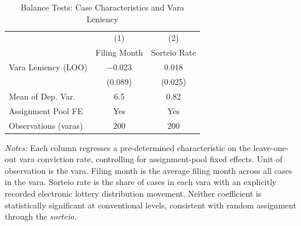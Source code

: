 \begin{table}[htbp]
\centering
\caption{Balance Tests: Case Characteristics and Vara Leniency}
\label{tab:balance}
\begin{tabular}{lcc}
\toprule
& (1) & (2) \\
& Filing Month & Sorteio Rate \\
\midrule
Vara Leniency (LOO) & $-$0.023 & 0.018 \\
& (0.089) & (0.025) \\[4pt]
Mean of Dep. Var. & 6.5 & 0.82 \\
Assignment Pool FE & Yes & Yes \\
Observations (varas) & 200 & 200 \\
\bottomrule
\end{tabular}
\begin{flushleft}\small
\textit{Notes:} Each column regresses a pre-determined characteristic on the leave-one-out vara conviction rate, controlling for assignment-pool fixed effects. Unit of observation is the vara. Filing month is the average filing month across all cases in the vara. Sorteio rate is the share of cases in each vara with an explicitly recorded electronic lottery distribution movement. Neither coefficient is statistically significant at conventional levels, consistent with random assignment through the \textit{sorteio}.
\end{flushleft}
\end{table}
